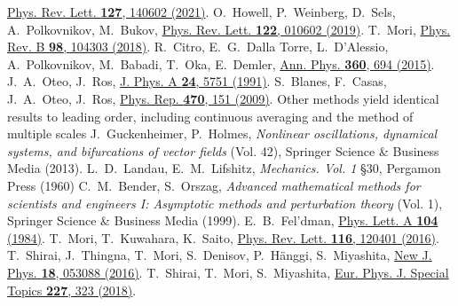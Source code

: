 \documentclass[prl,aps,twocolumn,notitlepage,10pt]{revtex4-1}
\begin{document}
\begin{references}
  \href{https://doi.org/10.1103/PhysRevLett.127.140602}{Phys. Rev. Lett. {\bf 127}, 140602 (2021)}.
  O.~Howell, P.~Weinberg, D.~Sels, A.~Polkovnikov, M.~Bukov,
  \href{https://doi.org/10.1103/PhysRevLett.122.010602}{Phys. Rev. Lett. {\bf 122}, 010602 (2019)}.
  T.~Mori,
  \href{https://doi.org/10.1103/PhysRevB.98.104303}{Phys. Rev. B {\bf 98}, 104303 (2018)}.
  R.~Citro, E.~G.~Dalla Torre, L.~D’Alessio, A.~Polkovnikov, M.~Babadi, T.~Oka, E.~Demler,
  \href{https://doi.org/10.1016/j.aop.2015.03.027}{Ann. Phys. {\bf 360}, 694 (2015)}.
  J.~A.~Oteo, J.~Ros,
  \href{https://doi.org/10.1088/0305-4470/24/24/011}{J. Phys. A {\bf 24}, 5751 (1991)}.
  S.~Blanes, F.~Casas, J.~A.~Oteo, J.~Ros,
  \href{https://doi.org/10.1016/j.physrep.2008.11.001}{Phys. Rep. {\bf 470}, 151 (2009)}.
  Other methods yield identical results to leading order, including
  continuous averaging \cite{Guckenheimer-Holmes,Kapitsa} and the method
  of multiple scales \cite{Bender-Orszag}
  J.~Guckenheimer, P.~Holmes, \emph{Nonlinear oscillations, dynamical systems, and bifurcations of vector fields} (Vol. 42), Springer Science \& Business Media (2013).
  L.~D.~Landau, E.~M.~Lifshitz, \emph{Mechanics. Vol. 1} \S 30, Pergamon Press (1960)
  C.~M.~Bender, S.~Orszag, \emph{Advanced mathematical methods for scientists and engineers I: Asymptotic methods and perturbation theory} (Vol. 1), Springer Science \& Business Media (1999).
  E.~B.~Fel'dman,
  \href{https://doi.org/10.1016/0375-9601(84)90027-6}{Phys. Lett. A {\bf 104} (1984)}.
  T.~Mori, T.~Kuwahara, K.~Saito,
  \href{https://doi.org/10.1103/PhysRevLett.116.120401}{Phys. Rev. Lett. {\bf 116}, 120401 (2016)}.
  T.~Shirai, J.~Thingna, T.~Mori, S.~Denisov, P.~H\"{a}nggi, S.~Miyashita,
  \href{https://doi.org/10.1088/1367-2630/18/5/053008}{New J. Phys. {\bf 18}, 053088 (2016)}.
  T.~Shirai, T.~Mori, S.~Miyashita,
  \href{https://doi.org/10.1140/epjst/e2018-00087-1}{Eur. Phys. J. Special Topics {\bf 227}, 323 (2018)}.
\end{references}
\end{document}

